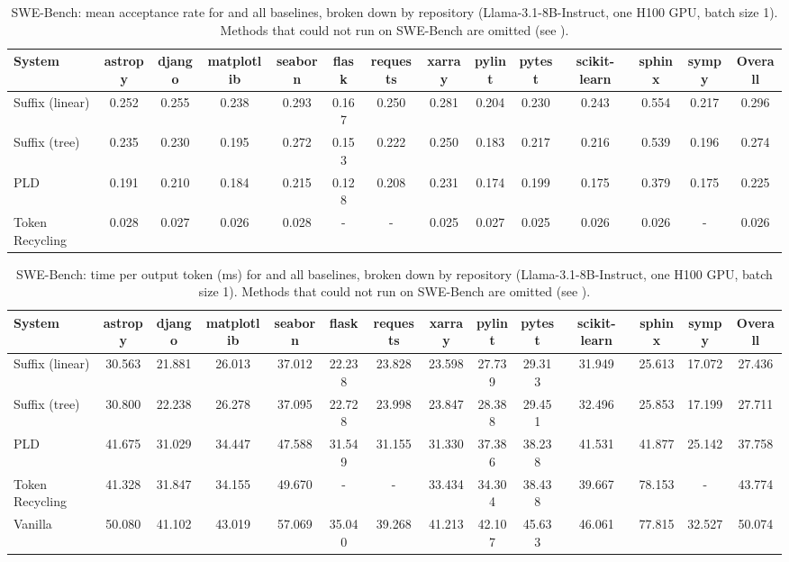 \begin{table}[htbp]
\centering
\caption{SWE-Bench: mean acceptance rate for \SuffixDecoding and all baselines, broken down by repository (Llama-3.1-8B-Instruct, one H100 GPU, batch size 1). Methods that could not run on SWE-Bench are omitted (see ).}
\label{suffixdecoding:tab:swe-rate}
\small
\begin{adjustbox}{width=\linewidth}
\begin{tabular}{lccccccccccccc}
\toprule
\textbf{System} & astropy & django & matplotlib & seaborn & flask & requests & xarray & pylint & pytest & scikit-learn & sphinx & sympy & \textbf{Overall} \\
\midrule
Suffix (linear) & 0.252 & 0.255 & 0.238 & 0.293 & 0.167 & 0.250 & 0.281 & 0.204 & 0.230 & 0.243 & 0.554 & 0.217 & 0.296 \\
Suffix (tree) & 0.235 & 0.230 & 0.195 & 0.272 & 0.153 & 0.222 & 0.250 & 0.183 & 0.217 & 0.216 & 0.539 & 0.196 & 0.274 \\
PLD & 0.191 & 0.210 & 0.184 & 0.215 & 0.128 & 0.208 & 0.231 & 0.174 & 0.199 & 0.175 & 0.379 & 0.175 & 0.225 \\
Token Recycling & 0.028 & 0.027 & 0.026 & 0.028 & - & - & 0.025 & 0.027 & 0.025 & 0.026 & 0.026 & - & 0.026 \\
\bottomrule
\end{tabular}
\end{adjustbox}
\end{table}

\begin{table}[htbp]
\centering
\caption{SWE-Bench: time per output token (ms) for \SuffixDecoding and all baselines, broken down by repository (Llama-3.1-8B-Instruct, one H100 GPU, batch size 1). Methods that could not run on SWE-Bench are omitted (see ).}
\label{suffixdecoding:tab:swe-tpot}
\small
\begin{adjustbox}{width=\linewidth}
\begin{tabular}{lccccccccccccc}
\toprule
\textbf{System} & astropy & django & matplotlib & seaborn & flask & requests & xarray & pylint & pytest & scikit-learn & sphinx & sympy & \textbf{Overall} \\
\midrule
Suffix (linear) & 30.563 & 21.881 & 26.013 & 37.012 & 22.238 & 23.828 & 23.598 & 27.739 & 29.313 & 31.949 & 25.613 & 17.072 & 27.436 \\
Suffix (tree) & 30.800 & 22.238 & 26.278 & 37.095 & 22.728 & 23.998 & 23.847 & 28.388 & 29.451 & 32.496 & 25.853 & 17.199 & 27.711 \\
PLD & 41.675 & 31.029 & 34.447 & 47.588 & 31.549 & 31.155 & 31.330 & 37.386 & 38.238 & 41.531 & 41.877 & 25.142 & 37.758 \\
Token Recycling & 41.328 & 31.847 & 34.155 & 49.670 & - & - & 33.434 & 34.304 & 38.438 & 39.667 & 78.153 & - & 43.774 \\
Vanilla & 50.080 & 41.102 & 43.019 & 57.069 & 35.040 & 39.268 & 41.213 & 42.107 & 45.633 & 46.061 & 77.815 & 32.527 & 50.074 \\
\bottomrule
\end{tabular}
\end{adjustbox}
\end{table}


